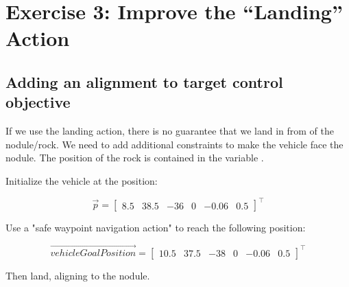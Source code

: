 	\section{Exercise 3: Improve the “Landing” Action}

	\subsection{Adding an alignment to target control objective}
	\question
	If we use the landing action, there is no guarantee that we land in from of the
	nodule/rock. We need to add additional constraints to make the vehicle face the
	nodule. The position of the rock is contained in the variable
	.

	Initialize the vehicle at the position:

	\begin{displaymath}
		\vec{p}
		=
		\begin{bmatrix}
			8.5 & 38.5 & -36 & 0 & -0.06 & 0.5
		\end{bmatrix}^\top
	\end{displaymath}

	Use a "safe waypoint navigation action" to reach the following position:

	\begin{displaymath}
		\vec{vehicleGoalPosition}
		=
		\begin{bmatrix}
			10.5 & 37.5 & -38 & 0 & -0.06 & 0.5
		\end{bmatrix}^\top
	\end{displaymath}

	Then land, aligning to the nodule.

